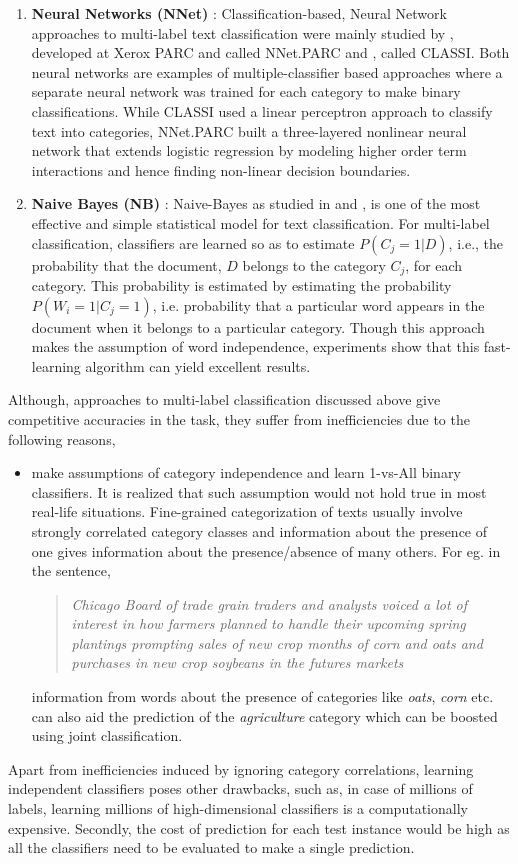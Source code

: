 \begin{enumerate}
\item{\textbf{Neural Networks (NNet)} : }Classification-based, Neural Network approaches to multi-label text classification were mainly studied by \cite{wiener1995neural}, developed at Xerox PARC and called NNet.PARC and \cite{ng1997feature}, called CLASSI. Both neural networks are examples of multiple-classifier based approaches where a separate neural network was trained for each category to make binary classifications. While CLASSI used a linear perceptron approach to classify text into categories, NNet.PARC built a three-layered nonlinear neural network that extends logistic regression by modeling higher order term interactions and hence finding non-linear decision boundaries. 

\item{\textbf{Naive Bayes (NB)} : }Naive-Bayes as studied in \cite{lewis1992representation} and \cite{lewis1994comparison}, is one of the most effective and simple statistical model for text classification. For multi-label classification, classifiers are learned so as to estimate $P(C_{j}=1|D)$, i.e., the probability that the document, $D$ belongs to the category $C_{j}$, for each category. This probability is estimated by estimating the probability $P(W_{i}=1|C_{j}=1)$, i.e. probability that a particular word appears in the document when it belongs to a particular category. Though this approach makes the assumption of word independence, experiments show that this fast-learning algorithm can yield excellent results. 
\end{enumerate}
Although, approaches to multi-label classification discussed above give competitive accuracies in the task, they suffer from inefficiencies due to the following reasons,
\begin{itemize}

\item make assumptions of category independence and learn 1-vs-All binary classifiers. It is realized that such assumption would not hold true in most real-life situations. Fine-grained categorization of texts usually involve strongly correlated category classes and information about the presence of one gives information about the presence/absence of many others. For eg. in the sentence, 
\begin{quote} 
\centering 
\emph{Chicago Board of trade grain traders and analysts voiced a lot of interest in how farmers planned to handle their upcoming spring plantings prompting sales of new crop months of corn and oats and purchases in new crop soybeans in the futures markets}
\end{quote}
information from words about the presence of categories like \emph{oats}, \emph{corn} etc. can also aid the prediction of the \emph{agriculture} category which can be boosted using joint classification.
\end{itemize}
Apart from inefficiencies induced by ignoring category correlations, learning independent classifiers poses other drawbacks, such as, in case of millions of labels, learning millions of high-dimensional classifiers is a computationally expensive. Secondly, the cost of prediction for each test instance would be high as all the classifiers need to be evaluated to make a single prediction.



